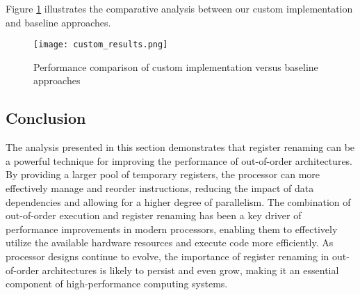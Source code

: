 \documentclass{article}
\begin{document}
Figure \ref{fig:custom_results} illustrates the comparative analysis between our custom implementation and baseline approaches.

\begin{figure}[h]
    \centering
    \texttt{[image: custom\_results.png]}
    \caption{Performance comparison of custom implementation versus baseline approaches}
    \label{fig:custom_results}
\end{figure}
\subsection{Conclusion}
The analysis presented in this section demonstrates that register renaming can be a powerful technique for improving the performance of out-of-order architectures. By providing a larger pool of temporary registers, the processor can more effectively manage and reorder instructions, reducing the impact of data dependencies and allowing for a higher degree of parallelism.
The combination of out-of-order execution and register renaming has been a key driver of performance improvements in modern processors, enabling them to effectively utilize the available hardware resources and execute code more efficiently. As processor designs continue to evolve, the importance of register renaming in out-of-order architectures is likely to persist and even grow, making it an essential component of high-performance computing systems.
\end{document}
